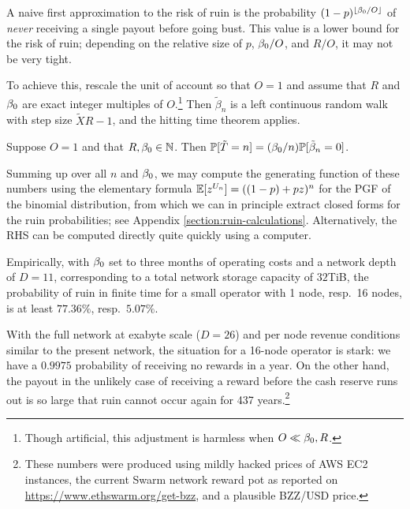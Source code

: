 \begin{remark}
  
  A naive first approximation to the risk of ruin is the probability $(1-p)^{\left\lfloor \beta_0/O \right\rfloor}$ of \emph{never} receiving a single payout before going bust.
  This value is a lower bound for the risk of ruin; depending on the relative size of $p$, $\beta_0/O$, and $R/O$, it may not be very tight.
  
\end{remark}


To achieve this, rescale the unit of account so that $O=1$ and assume that $R$ and $\beta_0$ are exact integer multiples of $O$.\footnote{Though artificial, this adjustment is harmless when $O\ll \beta_0,R$.}
%
Then $\tilde{\beta}_n$ is a left continuous random walk with step size $\tilde{X}R-1$, and the hitting time theorem \cite[Thm.~5.3.7]{grimmett2020probability} applies.

\begin{proposition}

  Suppose $O=1$ and that $R,\beta_0\in\mathbb{N}$.
  Then $\mathbb{P}[\tilde{T}=n] = (\beta_0/n)\mathbb{P}[\tilde{\beta}_n=0]$.

\end{proposition}

Summing up over all $n$ and $\beta_0$, we may compute the generating function of these numbers using the elementary formula $\mathbb{E}[z^{U_n}] = ((1-p) + pz)^n$ for the PGF of the binomial distribution, from which we can in principle extract closed forms for the ruin probabilities; see Appendix \ref{section:ruin-calculations}.
%
Alternatively, the RHS can be computed directly quite quickly using a computer.    
  


\begin{example}
\label{smno-calculations}

Empirically, with $\beta_0$ set to three months of operating costs and a network depth of $D=11$, corresponding to a total network storage capacity of $32$TiB, the probability of ruin in finite time for a small operator with 1 node, resp.~16 nodes, is at least $77.36\%$, resp.~$5.07\%$.
    
With the full network at exabyte scale ($D=26$) and per node revenue conditions similar to the present network, the situation for a 16-node operator is stark: we have a $0.9975$ probability of receiving no rewards in a year.
%
On the other hand, the payout in the unlikely case of receiving a reward before the cash reserve runs out is so large that ruin cannot occur again for 437 years.\footnote{These numbers were produced using mildly hacked prices of AWS EC2 instances, the current Swarm network reward pot as reported on \url{https://www.ethswarm.org/get-bzz}, and a plausible BZZ/USD price.}

\end{example}


